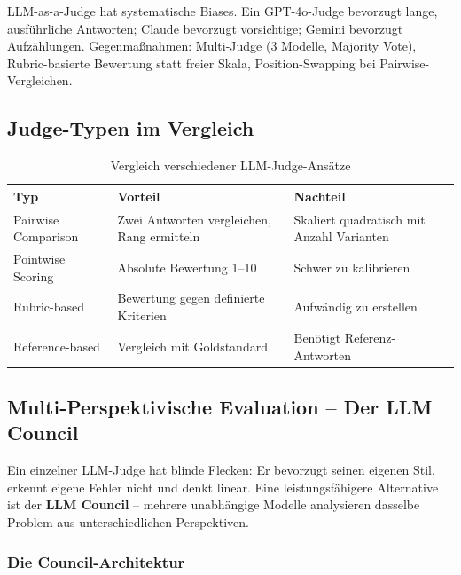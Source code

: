 \begin{praxishinweis}
LLM-as-a-Judge hat systematische Biases. Ein GPT-4o-Judge bevorzugt lange, ausführliche Antworten; Claude bevorzugt vorsichtige; Gemini bevorzugt Aufzählungen. Gegenmaßnahmen: Multi-Judge (3 Modelle, Majority Vote), Rubric-basierte Bewertung statt freier Skala, Position-Swapping bei Pairwise-Vergleichen.
\end{praxishinweis}

\subsection{Judge-Typen im Vergleich}

\begin{table}[H]
\centering
\begin{tabularx}{\linewidth}{lXX}
\toprule
\textbf{Typ} & \textbf{Vorteil} & \textbf{Nachteil} \\
\midrule
Pairwise Comparison & Zwei Antworten vergleichen, Rang ermitteln & Skaliert quadratisch mit Anzahl Varianten \\
Pointwise Scoring & Absolute Bewertung 1--10 & Schwer zu kalibrieren \\
Rubric-based & Bewertung gegen definierte Kriterien & Aufwändig zu erstellen \\
Reference-based & Vergleich mit Goldstandard & Benötigt Referenz-Antworten \\
\bottomrule
\end{tabularx}
\caption{Vergleich verschiedener LLM-Judge-Ansätze}
\end{table}

\subsection{Multi-Perspektivische Evaluation -- Der LLM Council}

Ein einzelner LLM-Judge hat blinde Flecken: Er bevorzugt seinen eigenen Stil, erkennt eigene Fehler nicht und denkt linear. Eine leistungsfähigere Alternative ist der \textbf{LLM Council} -- mehrere unabhängige Modelle analysieren dasselbe Problem aus unterschiedlichen Perspektiven.

\subsubsection{Die Council-Architektur}

